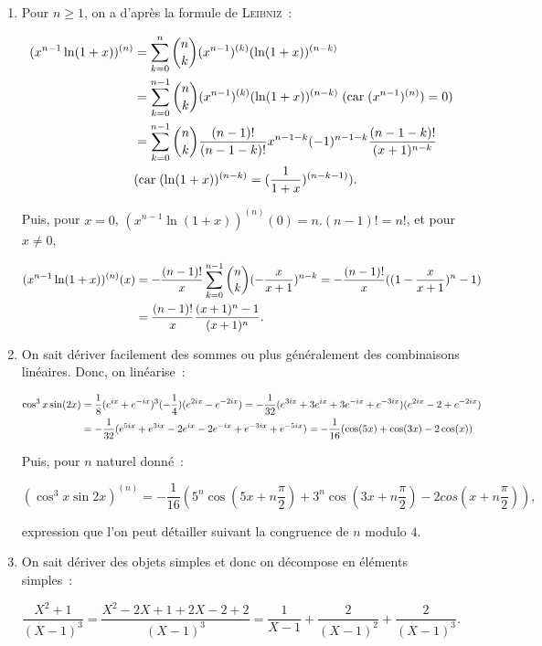 \documentclass[11pt,a4paper]{article}
\begin{document}
\begin{enumerate}
\item  Pour $n\geq1$, on a d'après la formule de \textsc{Leibniz}~:

\begin{align*}\ensuremath
(x^{n-1}\ln(1+x))^{(n)}&=\sum_{k=0}^{n}\dbinom{n}{k}(x^{n-1})^{(k)}(\ln(1+x))^{(n-k)}\\
 &=\sum_{k=0}^{n-1}\dbinom{n}{k}(x^{n-1})^{(k)}(\ln(1+x))^{(n-k)}\;(\mbox{car}\;(x^{n-1})^{(n)})=0)\\
 &=\sum_{k=0}^{n-1}\dbinom{n}{k}\frac{(n-1)!}{(n-1-k)!}x^{n-1-k}(-1)^{n-1-k}\frac{(n-1-k)!}{(x+1)^{n-k}}\\
 &(\mbox{car}\;(\ln(1+x))^{(n-k)}=(\frac{1}{1+x})^{(n-k-1)}).
\end{align*}

Puis, pour $x=0$, $(x^{n-1}\ln(1+x))^{(n)}(0)=n.(n-1)!=n!$, et pour $x\neq0$, 

\begin{align*}\ensuremath
(x^{n-1}\ln(1+x))^{(n)}(x)&=-\frac{(n-1)!}{x}\sum_{k=0}^{n-1}\dbinom{n}{k}(-\frac{x}{x+1})^{n-k}
=-\frac{(n-1)!}{x}((1-\frac{x}{x+1})^n-1)\\
 &=\frac{(n-1)!}{x}\frac{(x+1)^n-1}{(x+1)^n}.
\end{align*}

\item  On sait dériver facilement des sommes ou plus généralement des combinaisons linéaires. Donc, on linéarise~:

\begin{align*}\ensuremath
\cos^3x\sin(2x)&=\frac{1}{8}(e^{ix}+e^{-ix})^3(-\frac{1}{4})(e^{2ix}-e^{-2ix})=-\frac{1}{32}
(e^{3ix}+3e^{ix}+3e^{-ix}+e^{-3ix})(e^{2ix}-2+e^{-2ix})\\
 &=-\frac{1}{32}(e^{5ix}+e^{3ix}-2e^{ix}-2e^{-ix}+e^{-3ix}+e^{-5ix})=-\frac{1}{16}(\cos(5x)+\cos(3x)-2\cos(x))
\end{align*}

Puis, pour $n$ naturel donné~:

$$(\cos^3x\sin2x)^{(n)}=-\frac{1}{16}(5^n\cos(5x+n\frac{\pi}{2})+3^n\cos(3x+n\frac{\pi}{2})-2cos(x+n\frac{\pi}{2})),$$

expression que l'on peut détailler suivant la congruence de $n$ modulo $4$.

\item  On sait dériver des objets simples et donc on décompose en éléments simples~:

$$\frac{X^2+1}{(X-1)^3}=\frac{X^2-2X+1+2X-2+2}{(X-1)^3}=\frac{1}{X-1}+\frac{2}{(X-1)^2}+\frac{2}{(X-1)^3}.$$


\end{enumerate}
\end{document}

